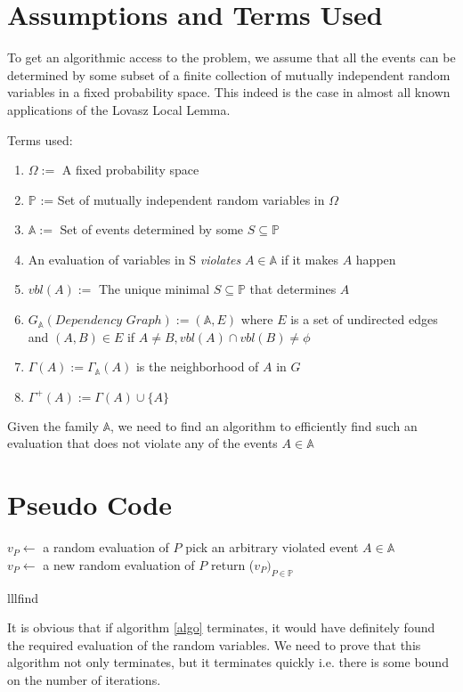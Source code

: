 \section{Assumptions and Terms Used}
To get an algorithmic access to the problem, we assume that all the events can be determined by some subset of a finite collection of mutually independent random variables in a fixed probability space. This indeed is the case in almost all known applications of the Lovasz Local Lemma.

Terms used:
\begin{enumerate} \itemsep -2pt
 \item $\Omega :=$ A fixed probability space
 \item $\mathbb{P}$ := Set of mutually independent random variables in $\Omega$
 \item $\mathbb{A} :=$ Set of events determined by some $S\subseteq\mathbb{P} $
 \item An evaluation of variables in S \emph{violates} $A\in\mathbb{A} $ if it makes $A$ happen
 \item $vbl(A) :=$ The unique minimal $S\subseteq\mathbb{P} $ that determines $A$
 \item $G_\mathbb{A}(Dependency\,\, Graph) := (\mathbb{A},E) $ where $E$ is a set of undirected edges and $(A,B)\in E $ if $A\neq B, vbl(A)\cap vbl(B) \neq \phi $
 \item $\Gamma(A):=\Gamma_\mathbb{A}(A) $ is the neighborhood of $A$ in $G$
 \item $\Gamma^+(A):=\Gamma(A)\cup\{A\} $
\end{enumerate}
Given the family $\mathbb{A}$, we need to find an algorithm to efficiently find such an evaluation that does not violate any of the events $A\in\mathbb{A}$

\section{Pseudo Code}
\begin{algorithm}[H]
\label{algo}
 {
  $v_P \leftarrow$ a random evaluation of $P$ }
 {
  pick an arbitrary violated event $A \in \mathbb{A}$\\
      {
    $v_P \leftarrow $ a new random evaluation of $P$
    }
  }
return ($v_P )_{P\in \mathbb{P}}$

 \caption{lllfind}
\end{algorithm}
It is obvious that if algorithm \ref{algo} terminates, it would have definitely found the required evaluation of the random variables. We need to prove that this algorithm not only terminates, but it terminates quickly i.e. there is some bound on the number of iterations.

